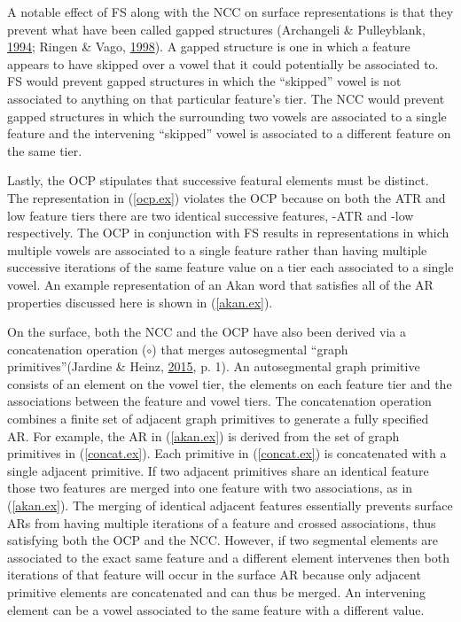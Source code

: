 \documentclass[,doc,floatsintext]{apa6}
\theoremstyle{definition}
\theoremstyle{definition}
\theoremstyle{definition}
\theoremstyle{remark}
\begin{document}
A notable effect of FS along with the NCC on surface representations is
that they prevent what have been called gapped structures (Archangeli \&
Pulleyblank, \protect\hyperlink{ref-archangelipulleyblank1994}{1994};
Ringen \& Vago, \protect\hyperlink{ref-ringenvago1998}{1998}). A gapped
structure is one in which a feature appears to have skipped over a vowel
that it could potentially be associated to. FS would prevent gapped
structures in which the \enquote{skipped} vowel is not associated to
anything on that particular feature's tier. The NCC would prevent gapped
structures in which the surrounding two vowels are associated to a
single feature and the intervening \enquote{skipped} vowel is associated
to a different feature on the same tier.

Lastly, the OCP stipulates that successive featural elements must be
distinct. The representation in (\ref{ocp.ex}) violates the OCP because
on both the ATR and low feature tiers there are two identical successive
features, -ATR and -low respectively. The OCP in conjunction with FS
results in representations in which multiple vowels are associated to a
single feature rather than having multiple successive iterations of the
same feature value on a tier each associated to a single vowel. An
example representation of an Akan word that satisfies all of the AR
properties discussed here is shown in (\ref{akan.ex}).

On the surface, both the NCC and the OCP have also been derived via a
concatenation operation (\(\circ\)) that merges autosegmental
\enquote{graph primitives}(Jardine \& Heinz,
\protect\hyperlink{ref-jardineheinz2015}{2015}, p. 1). An autosegmental
graph primitive consists of an element on the vowel tier, the elements
on each feature tier and the associations between the feature and vowel
tiers. The concatenation operation combines a finite set of adjacent
graph primitives to generate a fully specified AR. For example, the AR
in (\ref{akan.ex}) is derived from the set of graph primitives in
(\ref{concat.ex}). Each primitive in (\ref{concat.ex}) is concatenated
with a single adjacent primitive. If two adjacent primitives share an
identical feature those two features are merged into one feature with
two associations, as in (\ref{akan.ex}). The merging of identical
adjacent features essentially prevents surface ARs from having multiple
iterations of a feature and crossed associations, thus satisfying both
the OCP and the NCC. However, if two segmental elements are associated
to the exact same feature and a different element intervenes then both
iterations of that feature will occur in the surface AR because only
adjacent primitive elements are concatenated and can thus be merged. An
intervening element can be a vowel associated to the same feature with a
different value.
\end{document}
